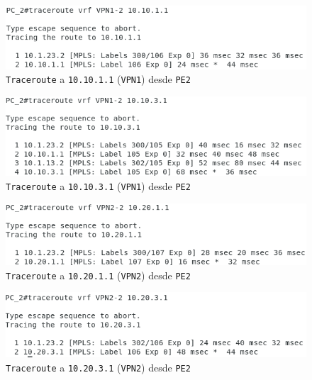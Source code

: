 \documentclass[11pt]{article}
\begin{document}
            \begin{figure}
                \centering
                \includegraphics[width=0.6\linewidth]{trace_10.10.1.1_PE_2.png}
                \caption{\texttt{Traceroute} a \texttt{10.10.1.1} (\texttt{VPN1}) desde \texttt{PE2}}
                \label{fig:trace_10.10.1.1_PE_2}
            \end{figure}

            \begin{figure}
                \centering
                \includegraphics[width=0.6\linewidth]{trace_10.10.3.1_PE_2.png}
                \caption{\texttt{Traceroute} a \texttt{10.10.3.1} (\texttt{VPN1}) desde \texttt{PE2}}
                \label{fig:trace_10.10.3.1_PE_2}
            \end{figure}

            \begin{figure}
                \centering
                \includegraphics[width=0.6\linewidth]{trace_10.20.1.1_PE_2.png}
                \caption{\texttt{Traceroute} a \texttt{10.20.1.1} (\texttt{VPN2}) desde \texttt{PE2}}
                \label{fig:trace_10.20.1.1_PE_2}
            \end{figure}

            \begin{figure}
                \centering
                \includegraphics[width=0.6\linewidth]{trace_10.20.3.1_PE_2.png}
                \caption{\texttt{Traceroute} a \texttt{10.20.3.1} (\texttt{VPN2}) desde \texttt{PE2}}
                \label{fig:trace_10.20.3.1_PE_2}
            \end{figure}
\end{document}
